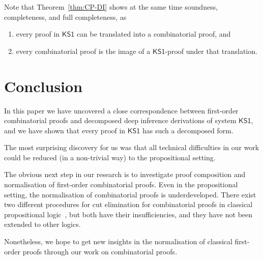 \documentclass[conference,twosided,10pt]{IEEEtran}
\newcommand{\lutz}[1]{{\color{blue}     \noindent[\![\![{\bf Lutz: }#1]\!]\!]}}
\newcommand{\todo}[1]{{\color{red}     \noindent[\![\![{\bf TODO: }#1]\!]\!]}}
\theoremstyle{definition}
\newcommand*{\FOKS}{\mathsf{KS1}}
\begin{document}
Note that Theorem~\ref{thm:CP-DI} shows at the same time soundness, completeness, and full completeness, as
\begin{enumerate}
\item every proof in $\FOKS$ can be translated into a combinatorial proof, and
\item every combinatorial proof is the image of a $\FOKS$-proof under that translation.
\end{enumerate}


\section{Conclusion}

In this paper we have uncovered a close correspondence between
first-order combinatorial proofs and decomposed deep inference
derivations of system $\FOKS$, and we have shown that every proof in
$\FOKS$ has such a decomposed form.

The most surprising discovery for us was that all technical
difficulties in our work could be reduced (in a non-trivial way) to
the propositional setting.

The obvious next step in our research is to investigate proof
composition and normalisation of first-order combinatorial
proofs. Even in the propositional setting, the normalisation of
combinatorial proofs is underdeveloped. There exist two different
procedures for cut elimination for combinatorial proofs in classical
propositional logic~\cite{hughes:invar,str:fscd17}, but both have
their insufficiencies, and they have not been extended to other
logics.

Nonetheless, we hope to get new insights in the normalisation of
classical first-order proofs through our work on combinatorial proofs.





\end{document}

